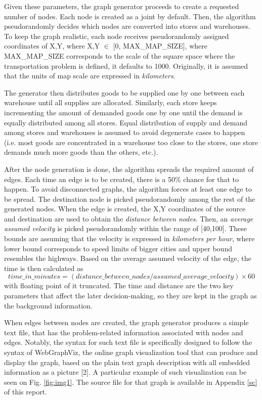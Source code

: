 \documentclass[journal,onecolumn]{IEEEtran}
\begin{document}
Given these parameters, the graph generator proceeds to create a requested number of nodes. Each node is created as a joint by default. Then, the algorithm pseudorandomly decides which nodes are converted into stores and warehouses. To keep the graph realistic, each node receives pseudorandomly assigned coordinates of {X,Y}, where X,Y \(\in\) [0, MAX\_MAP\_SIZE], where MAX\_MAP\_SIZE corresponds to the scale of the square space where the transportation problem is defined, it defaults to 1000. Originally, it is assumed that the units of map scale are expressed in \textit{kilometers}. 

The generator then distributes goods to be supplied one by one between each warehouse until all supplies are allocated. Similarly, each store keeps incrementing the amount of demanded goods one by one until the demand is equally distributed among all stores. Equal distribution of supply and demand among stores and warehouses is assumed to avoid degenerate cases to happen (i.e. most goods are concentrated in a warehouse too close to the stores, one store demands much more goods than the others, etc.).

After the node generation is done, the algorithm spreads the required amount of edges. Each time an edge is to be created, there is a 50\% chance for that to happen. To avoid disconnected graphs, the algorithm forces at least one edge to be spread. The destination node is picked pseudorandomly among the rest of the generated nodes. When the edge is created, the {X,Y} coordinates of the source and destination are used to obtain the \textit{distance between nodes}. Then, an \textit{average assumed velocity} is picked pseudorandomly within the range of [40,100]. These bounds are assuming that the velocity is expressed in \textit{kilometers per hour}, where lower bound corresponds to speed limits of bigger cities and upper bound resembles the highways. Based on the average assumed velocity of the edge, the time is then calculated as 
\begin{equation*}
time\_in\_minutes = (distance\_between\_nodes / assumed\_average\_velocity) \times 60
\end{equation*}
with floating point of it truncated. The time and distance are the two key parameters that affect the later decision-making, so they are kept in the graph as the background information.

When edges between nodes are created, the graph generator produces a simple text file, that has the problem-related information associated with nodes and edges. Notably, the syntax for such text file is specifically designed to follow the syntax of WebGraphViz, the online graph visualization tool that can produce and display the graph, based on the plain text graph description with all embedded information as a picture [2]. A particular example of such visualization can be seen on Fig. \ref{fig:img1}. The source file for that graph is available in Appendix \ref{sc} of this report.
\end{document}
